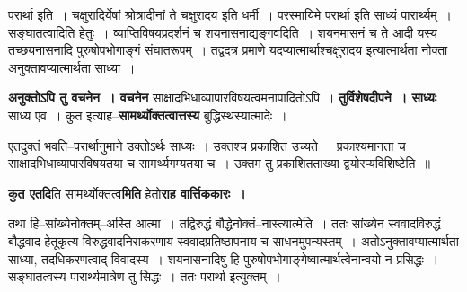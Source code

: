 \documentclass[article,12pt,a4paper]{memoir}
\begin{document}
	  \endgroup
	 

	  \pstart परार्था इति । चक्षुरादिर्येषां श्रोत्रादीनां ते चक्षुरादय इति धर्मी । परस्मायिमे परार्था इति साध्यं पारार्थ्यम् । सङ्घातत्वादिति हेतुः । व्याप्तिविषयप्रदर्शनं च शयनासनाद्यङ्गवदिति । शयनमासनं च ते आदी यस्य तच्छयनासनादि पुरुषोपभोगाङ्गं संघातरूपम् । तद्वदत्र प्रमाणे यदप्यात्मार्थाश्चक्षुरादय इत्यात्मार्थता नोक्ता अनुक्तावप्यात्मार्थता साध्या ।
	\pend
      
	  \endgroup
	

	  \pstart \textbf{अनुक्तोऽपि तु वचनेन । वचनेन} साक्षादभिधाव्यापारविषयत्वमनापादितोऽपि । \textbf{तुर्विशेषदीपने । साध्यः} साध्य एव । कुत इत्याह--\textbf{सामर्थ्योक्तत्वात्तस्य} बुद्धिस्थस्यात्मादेः ।
	\pend
      

	  \pstart एतदुक्तं भवति--परार्थानुमाने उक्तोऽर्थः साध्यः । उक्तश्च प्रकाशित उच्यते । प्रकाश्यमानता च साक्षादभिधाव्यापारविषयतया च सामर्थ्यगम्यतया च । उक्तम  तु प्रकाशितताख्या द्वयोरप्यविशिष्टेति ॥
	\pend
      

	  \pstart \textbf{कुत एतदि}ति सामर्थ्योक्तत्व\textbf{मिति} हेतो\textbf{राह वार्त्तिककारः ।}
	\pend
	  \bigskip
	  \begingroup
	

	  \pstart तथा हि--सांख्येनोक्तम्--अस्ति आत्मा । तद्विरुद्धं बौद्धेनोक्तं--नास्त्यात्मेति । ततः सांख्येन स्ववादविरुद्धं बौद्धवाद हेतूकृत्य विरुद्धवादनिराकरणाय स्ववादप्रतिष्ठापनाय च साधनमुपन्यस्तम् । अतोऽनुक्तावप्यात्मार्थता साध्या, तदधिकरणत्वाद् विवादस्य । शयनासनादिषु हि पुरुषोपभोगाङ्गेष्वात्मार्थत्वेनान्वयो न प्रसिद्धः । सङ्घातत्वस्य पारार्थ्यमात्रेण तु सिद्धः । ततः परार्था इत्युक्तम् ।
	\pend
        
\end{document}
